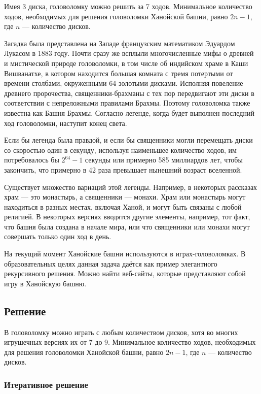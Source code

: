 Имея 3 диска, головоломку можно решить за 7 ходов. Минимальное количество
ходов, необходимых для решения головоломки Ханойской башни, равно $2n - 1$,
где $n$ --- количество дисков.

Загадка была представлена на Западе французским математиком Эдуардом Лукасом в
1883 году. Почти сразу же всплыли\cite{book:2211323} многочисленные мифы о
древней и мистической природе головоломки, в том числе об индийском храме в
Каши Вишванатхе, в котором находится большая комната с тремя потертыми от
времени столбами, окруженными 64 золотыми дисками. Исполняя повеление древнего
пророчества, священники-брахманы с тех пор передвигают эти диски в соответствии
с непреложными правилами Брахмы. Поэтому головоломка также известна как Башня
Брахмы. Согласно легенде, когда будет выполнен последний ход головоломки,
наступит конец света.\cite{book:73336}

Если бы легенда была правдой, и если бы священники могли перемещать диски со
скоростью один в секунду, используя наименьшее количество ходов, им
потребовалось бы $2^{64}-1$ секунды или примерно 585 миллиардов лет, чтобы
закончить, что примерно в 42 раза превышает нынешний возраст вселенной.

Существует множество вариаций этой легенды. Например, в некоторых рассказах
храм --- это монастырь, а священники --- монахи. Храм или монастырь могут
находиться в разных местах, включая Ханой, и могут быть связаны с любой
религией. В некоторых версиях вводятся другие элементы, например, тот факт, что
башня была создана в начале мира, или что священники или монахи могут совершать
только один ход в день.

На текущий момент Ханойские башни используются в играх-головоломках. В
образовательных целях данная задача даётся как пример элегантного рекурсивного
решения. Можно найти веб-сайты, которые представляют собой игру в Ханойскую
башню.

\subsection{Решение}

В головоломку можно играть с любым количеством дисков, хотя во многих
игрушечных версиях их от 7 до 9. Минимальное количество ходов, необходимых для
решения головоломки Ханойской башни, равно $2n-1$, где $n$ --- количество
дисков.\cite{book:781890}

\subsubsection{Итеративное решение}

